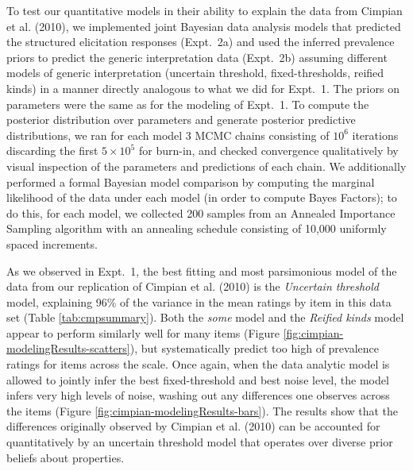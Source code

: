 \documentclass[floatsintext,doc]{apa6}
\begin{document}
To test our quantitative models in their ability to explain the data from Cimpian et al. (2010), we implemented joint Bayesian data analysis models that predicted the structured elicitation responses (Expt.~2a) and used the inferred prevalence priors to predict the generic interpretation data (Expt.~2b) assuming different models of generic interpretation (uncertain threshold, fixed-thresholds, reified kinds) in a manner directly analogous to what we did for Expt.~1. 
The priors on parameters were the same as for the modeling of Expt.~1. 
To compute the posterior distribution over parameters and generate posterior predictive distributions, we ran for each model 3 MCMC chains consisting of $10^6$ iterations discarding the first $5 \times 10^5$ for burn-in, and checked convergence qualitatively by visual inspection of the parameters and predictions of each chain. 
We additionally performed a formal Bayesian model comparison by computing the marginal likelihood of the data under each model (in order to compute Bayes Factors); to do this, for each model, we collected 200 samples from an Annealed Importance Sampling algorithm with an annealing schedule consisting of 10,000 uniformly spaced increments. 

As we observed in Expt.~1, the best fitting and most parsimonious model of the data from our replication of Cimpian et al. (2010) is the \emph{Uncertain threshold} model, explaining 96\% of the variance in the mean ratings by item in this data set (Table \ref{tab:cmpsummary}).
Both the \emph{some} model and the \emph{Reified kinds} model appear to perform similarly well for many items (Figure \ref{fig:cimpian-modelingResults-scatters}), but systematically predict too high of prevalence ratings for items across the scale. 
Once again, when the data analytic model is allowed to jointly infer the best fixed-threshold and best noise level, the model infers very high levels of noise, washing out any differences one observes across the items (Figure \ref{fig:cimpian-modelingResults-bars}).
The results show that the differences originally observed by Cimpian et al. (2010) can be accounted for quantitatively by an uncertain threshold model that operates over diverse prior beliefs about properties.

\end{document}
